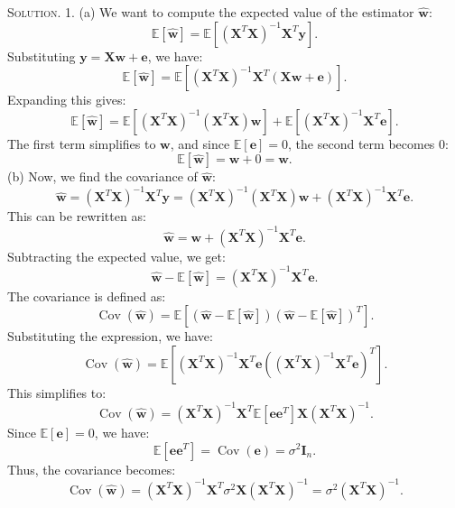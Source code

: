 \documentclass[12pt, a4paper, oneside]{ctexart}
\newenvironment{solution}{\par\noindent\textsc{Solution. }}{\\\par}
\begin{document}
\begin{solution}
	1. (a) We want to compute the expected value of the estimator \(\hat{\mathbf{w}}\):
	\[
	\mathbb{E}[\hat{\mathbf{w}}] = \mathbb{E}[(\mathbf{X}^{T}\mathbf{X})^{-1} \mathbf{X}^{T} \mathbf{y}].
	\]
	Substituting \(\mathbf{y} = \mathbf{X} \mathbf{w} + \mathbf{e}\), we have:
	\[
	\mathbb{E}[\hat{\mathbf{w}}] = \mathbb{E}[(\mathbf{X}^{T}\mathbf{X})^{-1} \mathbf{X}^{T}(\mathbf{X} \mathbf{w} + \mathbf{e})].
	\]
	Expanding this gives:
	\[
	\mathbb{E}[\hat{\mathbf{w}}] = \mathbb{E}[(\mathbf{X}^{T}\mathbf{X})^{-1} (\mathbf{X}^{T}\mathbf{X})\mathbf{w}] + \mathbb{E}[(\mathbf{X}^{T}\mathbf{X})^{-1} \mathbf{X}^{T}\mathbf{e}].
	\]
	The first term simplifies to \(\mathbf{w}\), and since \(\mathbb{E}[\mathbf{e}] = 0\), the second term becomes \(0\):
	\[
	\mathbb{E}[\hat{\mathbf{w}}] = \mathbf{w} + 0 = \mathbf{w}.
	\]
	\newline\newline
	(b) Now, we find the covariance of \(\hat{\mathbf{w}}\):
	\[
	\hat{\mathbf{w}} = (\mathbf{X}^{T}\mathbf{X})^{-1} \mathbf{X}^{T} \mathbf{y} = (\mathbf{X}^{T}\mathbf{X})^{-1} (\mathbf{X}^{T}\mathbf{X})\mathbf{w} + (\mathbf{X}^{T}\mathbf{X})^{-1} \mathbf{X}^{T} \mathbf{e}.
	\]
	This can be rewritten as:
	\[
	\hat{\mathbf{w}} = \mathbf{w} + (\mathbf{X}^{T}\mathbf{X})^{-1} \mathbf{X}^{T} \mathbf{e}.
	\]
	Subtracting the expected value, we get:
	\[
	\hat{\mathbf{w}} - \mathbb{E}[\hat{\mathbf{w}}] = (\mathbf{X}^{T}\mathbf{X})^{-1} \mathbf{X}^{T} \mathbf{e}.
	\]
	The covariance is defined as:
	\[
	\operatorname{Cov}(\hat{\mathbf{w}}) = \mathbb{E}\left[(\hat{\mathbf{w}} - \mathbb{E}[\hat{\mathbf{w}}])(\hat{\mathbf{w}} - \mathbb{E}[\hat{\mathbf{w}}])^{T}\right].
	\]
	Substituting the expression, we have:
	\[
	\operatorname{Cov}(\hat{\mathbf{w}}) = \mathbb{E}\left[(\mathbf{X}^{T}\mathbf{X})^{-1} \mathbf{X}^{T} \mathbf{e} ((\mathbf{X}^{T}\mathbf{X})^{-1} \mathbf{X}^{T} \mathbf{e})^{T}\right].
	\]
	This simplifies to:
	\[
	\operatorname{Cov}(\hat{\mathbf{w}}) = (\mathbf{X}^{T}\mathbf{X})^{-1} \mathbf{X}^{T} \mathbb{E}[\mathbf{e} \mathbf{e}^{T}] \mathbf{X} (\mathbf{X}^{T}\mathbf{X})^{-1}.
	\]
	Since \(\mathbb{E}[\mathbf{e}] = 0\), we have:
	\[
	\mathbb{E}[\mathbf{e} \mathbf{e}^{T}] = \operatorname{Cov}(\mathbf{e}) = \sigma^2 \mathbf{I}_n.
	\]
	Thus, the covariance becomes:
	\[
	\operatorname{Cov}(\hat{\mathbf{w}}) = (\mathbf{X}^{T}\mathbf{X})^{-1} \mathbf{X}^{T} \sigma^2 \mathbf{X} (\mathbf{X}^{T}\mathbf{X})^{-1} = \sigma^2 (\mathbf{X}^{T}\mathbf{X})^{-1}.
	\]
	\newline\newline

\end{solution}
\end{document}

